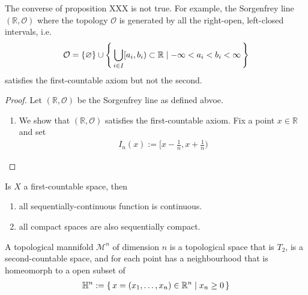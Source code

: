 \begin{exmbox}
    \begin{example}
        The converse of proposition XXX is not true. For example, the Sorgenfrey line \((\mathbb{R}, \mathcal{O})\) where the topology \(\mathcal{O}\) is generated by all the right-open, left-closed intervals, i.e.
        \begin{align*}
            \mathcal{O} = \{\varnothing\} \cup \left\{\, \bigcup_{i \in I} [a_i, b_i) \subset \mathbb{R} \mid -\infty < a_i < b_i < \infty \,\right\}
        \end{align*}
        satisfies the first-countable axiom but not the second.
    \end{example}
\end{exmbox}
%
\begin{proof}
    Let \((\mathbb{R}, \mathcal{O})\) be the Sorgenfrey line as defined abvoe.
    \begin{enumerate}
        \item We show that \((\mathbb{R}, \mathcal{O})\) satisfies the first-countable axiom. Fix a point \(x \in \mathbb{R}\) and set
        \begin{align*}
            I_n(x) := [x - \frac{1}{n}, x + \frac{1}{n})
        \end{align*}
    \end{enumerate}
\end{proof}
%
\begin{thmbox}
    \begin{lemma}
        Is \(X\) a first-countable space, then
        \begin{enumerate}
            \item all sequentially-continuous function is continuous.
            \item all compact spaces are also sequentially compact.
        \end{enumerate}
    \end{lemma}
\end{thmbox}

\begin{defbox}
    \begin{definition}
        A topological mannifold \(\mathcal{M}^n\) of dimension \(n\) is a topological space that is \(T_2\), is a second-countable space, and for each point has a neighbourhood that is homeomorph to a open subset of
        \begin{align*}
            \mathbb{H}^n := \left\{\, x = (x_1, \ldots, x_n) \in \mathbb{R}^n \mid x_n \geq 0 \,\right\}
        \end{align*}
    \end{definition}
\end{defbox}

